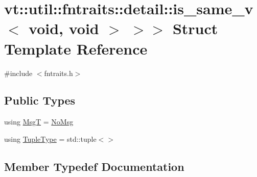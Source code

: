 \hypertarget{structvt_1_1util_1_1fntraits_1_1detail_1_1_c_b_traits_impl_3_01std_1_1enable__if__t_3_01std_1_1i933df4c983821ba8d7030f4c9e1d83e1}{}\section{vt\+:\+:util\+:\+:fntraits\+:\+:detail\+:\+:is\+\_\+same\+\_\+v$<$ void, void $>$ $>$$>$ Struct Template Reference}
\label{structvt_1_1util_1_1fntraits_1_1detail_1_1_c_b_traits_impl_3_01std_1_1enable__if__t_3_01std_1_1i933df4c983821ba8d7030f4c9e1d83e1}


{\ttfamily \#include $<$fntraits.\+h$>$}

\subsection*{Public Types}
\begin{DoxyCompactItemize}
\item 
using \hyperlink{structvt_1_1util_1_1fntraits_1_1detail_1_1_c_b_traits_impl_3_01std_1_1enable__if__t_3_01std_1_1i933df4c983821ba8d7030f4c9e1d83e1_a41e5b847c7b6656d27ca265f186ed2aa}{MsgT} = \hyperlink{structvt_1_1util_1_1fntraits_1_1detail_1_1_no_msg}{No\+Msg}
\item 
using \hyperlink{structvt_1_1util_1_1fntraits_1_1detail_1_1_c_b_traits_impl_3_01std_1_1enable__if__t_3_01std_1_1i933df4c983821ba8d7030f4c9e1d83e1_a4ed7e0b0d5e02f19c1f76597421a53d4}{Tuple\+Type} = std\+::tuple$<$$>$
\end{DoxyCompactItemize}


\subsection{Member Typedef Documentation}
\mbox{\label{structvt_1_1util_1_1fntraits_1_1detail_1_1_c_b_traits_impl_3_01std_1_1enable__if__t_3_01std_1_1i933df4c983821ba8d7030f4c9e1d83e1_a41e5b847c7b6656d27ca265f186ed2aa}} 
